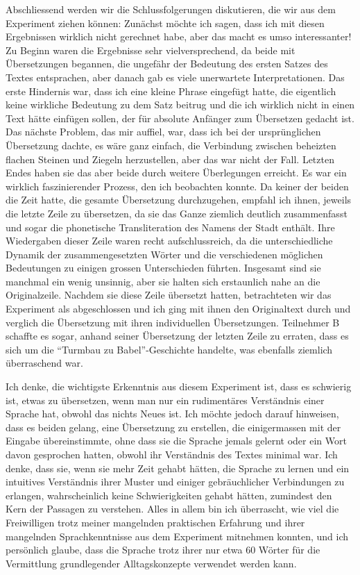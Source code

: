 \documentclass{article}
\begin{document}
Abschliessend werden wir die Schlussfolgerungen diskutieren, die wir aus dem Experiment ziehen können:
Zunächst möchte ich sagen, dass ich mit diesen Ergebnissen wirklich nicht gerechnet habe, aber das macht
es umso interessanter! Zu Beginn waren die Ergebnisse sehr vielversprechend, da beide mit Übersetzungen
begannen, die ungefähr der Bedeutung des ersten Satzes des Textes entsprachen, aber danach gab es viele
unerwartete Interpretationen. Das erste Hindernis war, dass ich eine kleine Phrase eingefügt hatte,
die eigentlich keine wirkliche Bedeutung zu dem Satz beitrug und die ich wirklich nicht in einen Text hätte
einfügen sollen, der für absolute Anfänger zum Übersetzen gedacht ist. Das nächste Problem, das mir auffiel,
war, dass ich bei der ursprünglichen Übersetzung dachte, es wäre ganz einfach, die Verbindung zwischen
beheizten flachen Steinen und Ziegeln herzustellen, aber das war nicht der Fall. Letzten Endes haben
sie das aber beide durch weitere Überlegungen erreicht. Es war ein wirklich faszinierender Prozess,
den ich beobachten konnte. Da keiner der beiden die Zeit hatte, die gesamte Übersetzung durchzugehen,
empfahl ich ihnen, jeweils die letzte Zeile zu übersetzen, da sie das Ganze ziemlich deutlich zusammenfasst
und sogar die phonetische Transliteration des Namens der Stadt enthält. Ihre Wiedergaben dieser Zeile waren
recht aufschlussreich, da die unterschiedliche Dynamik der zusammengesetzten Wörter und die verschiedenen
möglichen Bedeutungen zu einigen grossen Unterschieden führten. Insgesamt sind sie manchmal ein wenig unsinnig,
aber sie halten sich erstaunlich nahe an die Originalzeile. Nachdem sie diese Zeile übersetzt hatten,
betrachteten wir das Experiment als abgeschlossen und ich ging mit ihnen den Originaltext durch und
verglich die Übersetzung mit ihren individuellen Übersetzungen. Teilnehmer B schaffte es sogar,
anhand seiner Übersetzung der letzten Zeile zu erraten, dass es sich um die ``Turmbau zu Babel''-Geschichte
handelte, was ebenfalls ziemlich überraschend war.

Ich denke, die wichtigste Erkenntnis aus diesem Experiment ist, dass es schwierig ist, etwas zu übersetzen,
wenn man nur ein rudimentäres Verständnis einer Sprache hat, obwohl das nichts Neues ist.
Ich möchte jedoch darauf hinweisen, dass es beiden gelang, eine Übersetzung zu erstellen,
die einigermassen mit der Eingabe übereinstimmte, ohne dass sie die Sprache jemals gelernt oder ein Wort
davon gesprochen hatten, obwohl ihr Verständnis des Textes minimal war. Ich denke, dass sie,
wenn sie mehr Zeit gehabt hätten, die Sprache zu lernen und ein intuitives Verständnis ihrer Muster und
einiger gebräuchlicher Verbindungen zu erlangen, wahrscheinlich keine Schwierigkeiten gehabt hätten,
zumindest den Kern der Passagen zu verstehen. Alles in allem bin ich überrascht, wie viel die Freiwilligen
trotz meiner mangelnden praktischen Erfahrung und ihrer mangelnden Sprachkenntnisse aus dem Experiment
mitnehmen konnten, und ich persönlich glaube, dass die Sprache trotz ihrer nur etwa 60 Wörter für die Vermittlung
grundlegender Alltagskonzepte verwendet werden kann.
\end{document}
